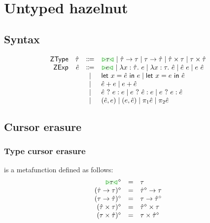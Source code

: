 \documentclass[formalism.tex]{subfiles}
\begin{document}




\section{Untyped hazelnut}

\subsection{Syntax}
\[\begin{array}{rrcl}
  \ZTMName & \ZTMV & \Coloneqq & \ZTCursor{\TMV} \mid \ZTArrowL{\ZTMV}{\TMV} \mid \ZTArrowR{\TMV}{\ZTMV} \mid \ZTProdL{\ZTMV}{\TMV} \mid \ZTProdR{\TMV}{\ZTMV} \\
  \ZMName  & \ZMV  & \Coloneqq & \ZCursor{\EMV} \mid \ZLamT{x}{\ZTMV}{\EMV} \mid \ZLamE{x}{\TMV}{\ZMV} \mid \ZApL{\ZMV}{\EMV} \mid \ZApR{\EMV}{\ZMV} \\
           &       & \mid         & \ZLetL{x}{\ZMV}{\EMV} \mid \ZLetR{x}{\EMV}{\ZMV} \\
           &       & \mid         & \ZPlusL{\ZMV}{\EMV} \mid \ZPlusR{\EMV}{\ZMV} \\
           &       & \mid         & \ZIfC{\ZMV}{\EMV}{\EMV} \mid \ZIfL{\EMV}{\ZMV}{\EMV} \mid \ZIfR{\EMV}{\EMV}{\ZMV} \\
           &       & \mid         & \ZPairL{\ZMV}{\EMV} \mid \ZPairR{\EMV}{\ZMV} \mid \ZProjL{\ZMV} \mid \ZProjR{\ZMV} \\
\end{array}\]

\subsection{Cursor erasure}
\subsubsection{Type cursor erasure}
\judgbox{\ensuremath{\cursorErase{\ZTMV}}} is a metafunction defined as follows:
%
\newcommand{\cursorErasesToRow}[2]{\ensuremath{\cursorErase{#1} & = & #2}}
\[\begin{array}{rcl}
  \cursorErasesToRow{\ZTCursor{\TMV}}{\TMV} \\
  \cursorErasesToRow{(\ZTArrowL{\ZTMV}{\TMV})}{\TArrow{\cursorErase{\ZTMV}}{\TMV}} \\
  \cursorErasesToRow{(\ZTArrowR{\TMV}{\ZTMV})}{\TArrow{\TMV}{\cursorErase{\ZTMV}}} \\
  \cursorErasesToRow{(\ZTProdL{\ZTMV}{\TMV})}{\TProd{\cursorErase{\ZTMV}}{\TMV}} \\
  \cursorErasesToRow{(\ZTProdR{\TMV}{\ZTMV})}{\TProd{\TMV}{\cursorErase{\ZTMV}}} \\
\end{array}\]
\end{document}
